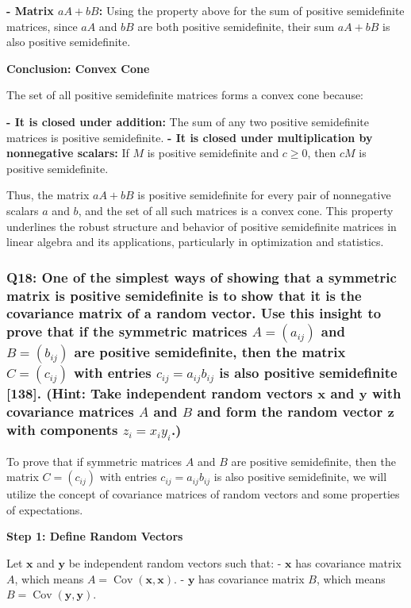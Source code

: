 \documentclass[8pt]{article}
\begin{document}
{\textbf{- Matrix \(aA + bB\): }Using the property above for the sum of positive semidefinite matrices, since \(aA\) and \(bB\) are both positive semidefinite, their sum \(aA + bB\) is also positive semidefinite.

\textbf{Conclusion: Convex Cone}

The set of all positive semidefinite matrices forms a convex cone because:

\textbf{- It is closed under addition:} The sum of any two positive semidefinite matrices is positive semidefinite.
\textbf{- It is closed under multiplication by nonnegative scalars: }If \(M\) is positive semidefinite and \(c \geq 0\), then \(cM\) is positive semidefinite.

Thus, the matrix \(aA + bB\) is positive semidefinite for every pair of nonnegative scalars \(a\) and \(b\), and the set of all such matrices is a convex cone. This property underlines the robust structure and behavior of positive semidefinite matrices in linear algebra and its applications, particularly in optimization and statistics.

\subsubsection*{Q18: One of the simplest ways of showing that a symmetric matrix is positive semidefinite is to show that it is the covariance matrix of a random vector. Use this insight to prove that if the symmetric matrices \(A = (a_{ij})\) and \(B = (b_{ij})\) are positive semidefinite, then the matrix \(C = (c_{ij})\) with entries \(c_{ij} = a_{ij} b_{ij}\) is also positive semidefinite [138]. (Hint: Take independent random vectors \(\mathbf{x}\) and \(\mathbf{y}\) with covariance matrices \(A\) and \(B\) and form the random vector \(\mathbf{z}\) with components \(z_i = x_i y_i\).)}

To prove that if symmetric matrices \(A\) and \(B\) are positive semidefinite, then the matrix \(C = (c_{ij})\) with entries \(c_{ij} = a_{ij} b_{ij}\) is also positive semidefinite, we will utilize the concept of covariance matrices of random vectors and some properties of expectations.

\textbf{Step 1: Define Random Vectors}

Let \(\mathbf{x}\) and \(\mathbf{y}\) be independent random vectors such that:
- \(\mathbf{x}\) has covariance matrix \(A\), which means \(A = \operatorname{Cov}(\mathbf{x}, \mathbf{x})\).
- \(\mathbf{y}\) has covariance matrix \(B\), which means \(B = \operatorname{Cov}(\mathbf{y}, \mathbf{y})\).

}
\end{document}
